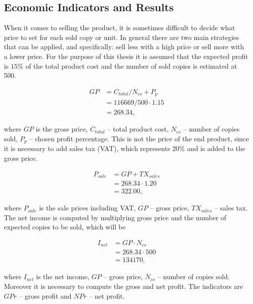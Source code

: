 \subsection{Economic Indicators and Results}

When it comes to selling the product, it is sometimes difficult to decide what
price to set for each sold copy or unit. In general there are two main
strategies that can be applied, and specifically: sell less with a high price
or sell more with a lower price. For the purpose of this thesis it is assumed
that the expected profit is $15\%$ of the total product cost and the number
of sold copies is estimated at 500.

\begin{equation}
\begin{split}
GP &= C_{total} / N_{cs} + P_{p}\\
    &= 116669/500 \cdot 1.15 \\
    &= 268.34,
\end{split}
\end{equation}

\noindent where $GP$ is the gross price, $C_{total}$ -- total product cost,
$N_{cs}$ -- number of copies sold, $P_{p}$ -- chosen profit percentage. This
is not the price of the end product, since it is necessary to add sales tax
(VAT), which represents $20\%$ and is added to the gross price.

\begin{equation}
\begin{split}
P_{sale} &= GP + TX_{sales}\\
            &= 268.34 \cdot 1.20 \\
            &= 322.00,
\end{split}
\end{equation}

\noindent where $P_{sale}$ is the sale prices including VAT, $GP$ -- gross
price, $TX_{sales}$ -- sales tax. The net income is computed by multiplying
gross price and the number of expected copies to be sold, which will be

\begin{equation}
\begin{split}
I_{net} &= GP \cdot N_{cs}\\
        &= 268.34 \cdot 500 \\
        &= 134170,
\end{split}
\end{equation}

\noindent where $I_{net}$ is the net income, $GP$ -- gross price, $N_{cs}$ --
number of copies sold. Moreover it is necessary to compute the gross and net
profit. The indicators are $GPr$ -- gross profit and $NPr$ -- net profit.

